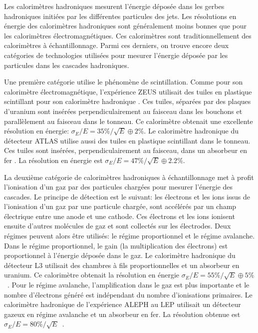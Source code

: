 Les calorimètres hadroniques mesurent l'énergie déposée dans les gerbes hadroniques initiées par les différentes particules des jets. Les résolutions en énergie des calorimètres hadroniques sont généralement moins bonnes que pour les calorimètres électromagnétiques. Ces calorimètres sont traditionnellement des calorimètres à échantillonnage. Parmi ces derniers, on trouve encore deux catégories de technologies utilisées pour mesurer l'énergie déposée par les particules dans les cascades hadroniques. 

Une première catégorie utilise le phénomène de scintillation. Comme pour son calorimètre électromagnétique, l'expérience ZEUS utilisait des tuiles en plastique scintillant pour son calorimètre hadronique \cite{zeus-hcal}. Ces tuiles, séparées par des plaques d'uranium sont insérées perpendiculairement au faisceau dans les bouchons et parallèlement au faisceau dans le tonneau. Ce calorimètre obtenait une excellente résolution en énergie: $\sigma_E/E=35\%/\sqrt{E}\oplus2\%$. Le calorimètre hadronique du détecteur ATLAS utilise aussi des tuiles en plastique scintillant dans le tonneau. Ces tuiles sont insérées, perpendiculairement au faisceau, dans un absorbeur en fer \cite{atlas-hadron-tilecal}. La résolution en énergie est $\sigma_E/E=47\%/\sqrt{E}\oplus2.2\%$.

La deuxième catégorie de calorimètres hadroniques à échantillonnage met à profit l'ionisation d'un gaz par des particules chargées pour mesurer l'énergie des cascades. Le principe de détection est le suivant: les électrons et les ions issus de l'ionisation d'un gaz par une particule chargée, sont accélérés par un champ électrique entre une anode et une cathode. Ces électrons et les ions ionisent ensuite d'autres molécules de gaz et sont collectés sur les électrodes. Deux régimes peuvent alors être utilisés: le régime proportionnel et le régime avalanche. Dans le régime proportionnel, le gain (la multiplication des électrons) est proportionnel à l'énergie déposée dans le gaz. Le calorimètre hadronique du détecteur L3 utilisait des chambres à fils proportionnelles et un absorbeur en uranium. Ce calorimètre obtenait la résolution en énergie $\sigma_E/E=55\%/\sqrt{E}\oplus5\%$~\cite{l3-hadron-calo}. Pour le régime avalanche, l'amplification dans le gaz est plus importante et le nombre d'électrons généré est indépendant du nombre d'ionisations primaires. Le calorimètre hadronique de l'expérience ALEPH au LEP utilisait un détecteur gazeux en régime avalanche et un absorbeur en fer. La résolution obtenue est $\sigma_E/E=80\%/\sqrt{E}$~\cite{aleph-hadron-calo}.

